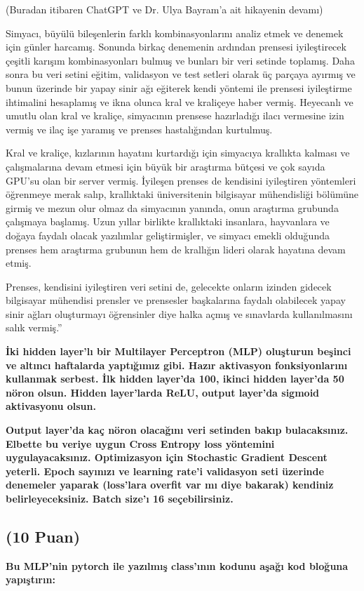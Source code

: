 \documentclass[11pt]{article}
\begin{document}
(Buradan itibaren ChatGPT ve Dr. Ulya Bayram'a ait hikayenin devamı)

Simyacı, büyülü bileşenlerin farklı kombinasyonlarını analiz etmek ve denemek için günler harcamış. Sonunda birkaç denemenin ardından prensesi iyileştirecek çeşitli karışım kombinasyonları bulmuş ve bunları bir veri setinde toplamış. Daha sonra bu veri setini eğitim, validasyon ve test setleri olarak üç parçaya ayırmış ve bunun üzerinde bir yapay sinir ağı eğiterek kendi yöntemi ile prensesi iyileştirme ihtimalini hesaplamış ve ikna olunca kral ve kraliçeye haber vermiş. Heyecanlı ve umutlu olan kral ve kraliçe, simyacının prensese hazırladığı ilacı vermesine izin vermiş ve ilaç işe yaramış ve prenses hastalığından kurtulmuş.

Kral ve kraliçe, kızlarının hayatını kurtardığı için simyacıya krallıkta kalması ve çalışmalarına devam etmesi için büyük bir araştırma bütçesi ve çok sayıda GPU'su olan bir server vermiş. İyileşen prenses de kendisini iyileştiren yöntemleri öğrenmeye merak salıp, krallıktaki üniversitenin bilgisayar mühendisliği bölümüne girmiş ve mezun olur olmaz da simyacının yanında, onun araştırma grubunda çalışmaya başlamış. Uzun yıllar birlikte krallıktaki insanlara, hayvanlara ve doğaya faydalı olacak yazılımlar geliştirmişler, ve simyacı emekli olduğunda prenses hem araştırma grubunun hem de krallığın lideri olarak hayatına devam etmiş.

Prenses, kendisini iyileştiren veri setini de, gelecekte onların izinden gidecek bilgisayar mühendisi prensler ve prensesler başkalarına faydalı olabilecek yapay sinir ağları oluşturmayı öğrensinler diye halka açmış ve sınavlarda kullanılmasını salık vermiş.''

\textbf{İki hidden layer'lı bir Multilayer Perceptron (MLP) oluşturun beşinci ve altıncı haftalarda yaptığımız gibi. Hazır aktivasyon fonksiyonlarını kullanmak serbest. İlk hidden layer'da 100, ikinci hidden layer'da 50 nöron olsun. Hidden layer'larda ReLU, output layer'da sigmoid aktivasyonu olsun.}

\textbf{Output layer'da kaç nöron olacağını veri setinden bakıp bulacaksınız. Elbette bu veriye uygun Cross Entropy loss yöntemini uygulayacaksınız. Optimizasyon için Stochastic Gradient Descent yeterli. Epoch sayınızı ve learning rate'i validasyon seti üzerinde denemeler yaparak (loss'lara overfit var mı diye bakarak) kendiniz belirleyeceksiniz. Batch size'ı 16 seçebilirsiniz.}

\subsection{(10 Puan)} \textbf{Bu MLP'nin pytorch ile yazılmış class'ının kodunu aşağı kod bloğuna yapıştırın:}
\end{document}
